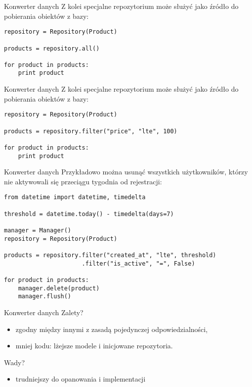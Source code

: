 \begin{frame}[fragile]{Konwerter danych}
	Z kolei specjalne repozytorium może służyć jako źródło do pobierania obiektów z bazy:
	
	\begin{lstlisting}	
repository = Repository(Product)

products = repository.all()

for product in products:
    print product
	\end{lstlisting}
\end{frame}

\begin{frame}[fragile]{Konwerter danych}
	Z kolei specjalne repozytorium może służyć jako źródło do pobierania obiektów z bazy:
	
	\begin{lstlisting}	
repository = Repository(Product)

products = repository.filter("price", "lte", 100)

for product in products:
    print product
	\end{lstlisting}
\end{frame}

\begin{frame}[fragile]{Konwerter danych}
	Przykładowo można usunąć wszystkich użytkowników, którzy nie aktywowali się przeciągu tygodnia od rejestracji:
	
	\begin{lstlisting}	
from datetime import datetime, timedelta

threshold = datetime.today() - timedelta(days=7)

manager = Manager()
repository = Repository(Product)

products = repository.filter("created_at", "lte", threshold)
                      .filter("is_active", "=", False)

for product in products:
    manager.delete(product)
    manager.flush()
	\end{lstlisting}
\end{frame}

\begin{frame}[fragile]{Konwerter danych}
	Zalety?
	\begin{itemize}
		\item zgodny między innymi z zasadą pojedynczej odpowiedzialności,
		\item mniej kodu: lżejsze modele i inicjowane repozytoria.
	\end{itemize}
	
	Wady?
	\begin{itemize}
		\item trudniejszy do opanowania i implementacji
	\end{itemize}
\end{frame}

